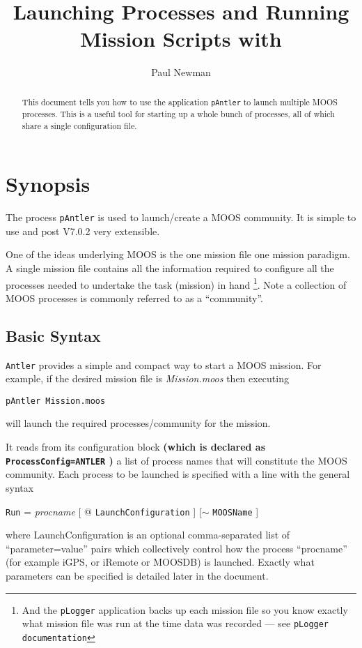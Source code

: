 \documentclass[a4paper,10pt]{article}
\title{Launching Processes and Running Mission Scripts with \code{Antler}}
\author{Paul Newman}
\newcommand{\Code}[1]{\texttt{#1} }
\newcommand{\code}[1]{\Code{#1} }
\begin{document}
\maketitle

\begin{center}
\end{center}


\begin{abstract}
This document tells you how to use the application \code{pAntler} to launch multiple MOOS processes. This is a useful tool for starting up a whole bunch of processes, all of which share a single configuration file.
\end{abstract}

\newpage
\tableofcontents
\newpage

\section{Synopsis}
The process \code{pAntler} is used to launch/create a MOOS
community. It is  simple to use and post V7.0.2 very extensible.

One of the ideas underlying MOOS is the one mission file one mission paradigm. A single mission file contains all the information required to configure all the processes needed to undertake the task (mission) in hand \footnote{And the \code{pLogger} application backs up each mission file so you know exactly what mission file was run at the time data was recorded --- see \code{pLogger documentation}}.  Note a collection of MOOS processes is commonly referred to as a ``community''.


\subsection{Basic Syntax}

\code{Antler} provides a simple and compact way to start a MOOS mission. For example, if the desired mission file is
{\it{Mission.moos}} then executing
\begin{center}
\code{pAntler Mission.moos}
\end{center}
will launch the required processes/community for the  mission.

It reads from its configuration block {\textbf{(which is declared as  \code{ProcessConfig=ANTLER})}} a list of process names that will constitute
the MOOS community. Each process to be launched is specified with a line with the general syntax
\begin{center}
{\code{Run}} = {\it{procname}} [ @ \code{LaunchConfiguration}] [$\sim$ \code{MOOSName}]
\end{center}
where LaunchConfiguration is an optional  comma-separated list of ``parameter=value'' pairs which collectively control how the process ``procname'' (for example iGPS, or iRemote or MOOSDB) is launched. Exactly what parameters can be specified is detailed later in the document.
\end{document}
